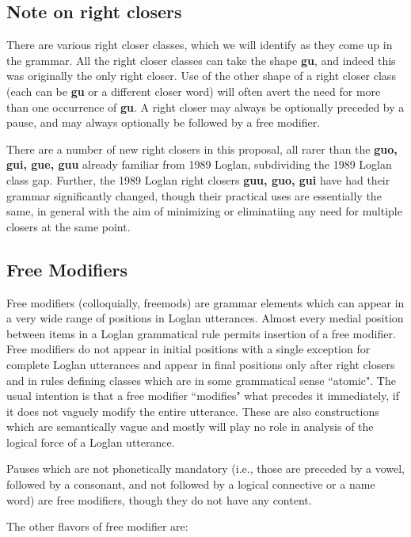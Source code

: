 \documentclass[12pt]{book}
\begin{document}
\subsection{Note on right closers}

There are various right closer classes, which we will identify as they come up in the grammar.  All the right closer classes can take the shape
{\bf gu}, and indeed this was originally the only right closer.  Use of the other shape of a right closer class (each can be {\bf gu} or a different closer word)  will often avert the need for
more than one occurrence of {\bf gu}.  A right closer may always be optionally preceded by a pause, and may always optionally be followed by a free modifier.

There are a number of new right closers in this proposal, all rarer than the {\bf guo, gui, gue, guu} already familiar from 1989 Loglan, subdividing the 1989 Loglan class gap.
Further, the 1989 Loglan right closers {\bf guu, guo, gui} have had their grammar significantly changed, though their practical uses are essentially the same, in general with the aim
of minimizing or eliminatiing any need for multiple closers at the same point.

\subsection{Free Modifiers}

Free modifiers (colloquially, freemods) are grammar elements which can appear in a very wide range of positions in Loglan utterances.  Almost every medial position between items in a Loglan grammatical rule permits insertion of a free modifier.  Free modifiers do not appear in initial positions with a single exception for
complete Loglan utterances and appear in final positions only after right closers and in rules defining classes which are in some grammatical sense ``atomic".  The usual intention is that a free modifier ``modifies" what precedes it immediately, if it does not vaguely modify the entire utterance.  These are also constructions which are semantically vague and mostly will play no role in analysis of the logical force of a Loglan utterance.

Pauses which are not phonetically mandatory (i.e., those are preceded by a vowel, followed by a consonant, and not followed by a logical connective or a name word) are free modifiers, though they do not have any content.

The other flavors of free modifier are:
\end{document}
